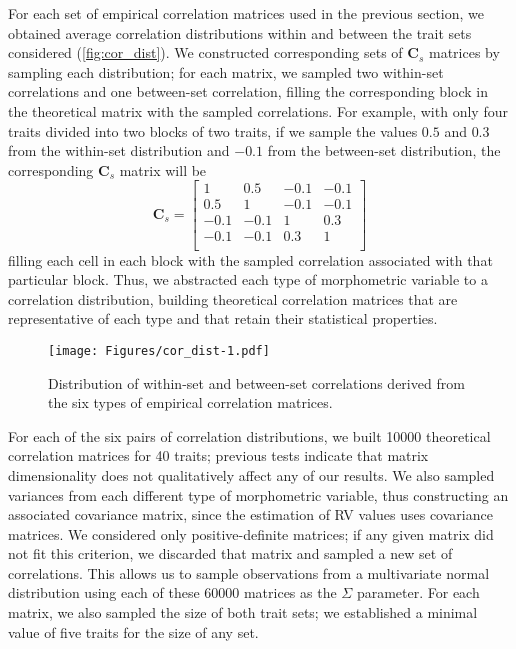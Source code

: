 \documentclass[12pt,twoside]{report}
\begin{document}
For each set of empirical correlation matrices used in the previous
section, we obtained average correlation distributions within and
between the trait sets considered (\autoref{fig:cor_dist}). We
constructed corresponding sets of $\mathbf{C}_{s}$ matrices by sampling
each distribution; for each matrix, we sampled two within-set
correlations and one between-set correlation, filling the corresponding
block in the theoretical matrix with the sampled correlations. For
example, with only four traits divided into two blocks of two traits, if
we sample the values $0.5$ and $0.3$ from the within-set distribution
and $-0.1$ from the between-set distribution, the corresponding
$\mathbf{C}_{s}$ matrix will be \[
\mathbf{C}_s =
\begin{bmatrix}
1 & 0.5 & -0.1 & -0.1 \\
0.5 & 1 & -0.1 & -0.1 \\
-0.1 & -0.1 & 1 & 0.3 \\
-0.1 & -0.1 & 0.3 & 1 \\
\end{bmatrix}
\] filling each cell in each block with the sampled correlation
associated with that particular block. Thus, we abstracted each type of
morphometric variable to a correlation distribution, building
theoretical correlation matrices that are representative of each type
and that retain their statistical properties.

\begin{figure}[htbp]
\centering
\texttt{[image: Figures/cor\_dist-1.pdf]}
\caption{Distribution of within-set and between-set correlations derived
from the six types of empirical correlation matrices.
\label{fig:cor_dist}}
\end{figure}

For each of the six pairs of correlation distributions, we built 10000
theoretical correlation matrices for 40 traits; previous tests indicate
that matrix dimensionality does not qualitatively affect any of our
results. We also sampled variances from each different type of
morphometric variable, thus constructing an associated covariance
matrix, since the estimation of RV values uses covariance matrices. We
considered only positive-definite matrices; if any given matrix did not
fit this criterion, we discarded that matrix and sampled a new set of
correlations. This allows us to sample observations from a multivariate
normal distribution using each of these 60000 matrices as the $\Sigma$
parameter. For each matrix, we also sampled the size of both trait sets;
we established a minimal value of five traits for the size of any set.
\end{document}
